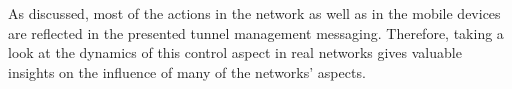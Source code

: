 As discussed, most of the actions in the network as well as in the mobile devices are reflected in the presented tunnel management messaging. Therefore, taking a look at the dynamics of this control aspect in real networks gives valuable insights on the influence of many of the networks' aspects.














